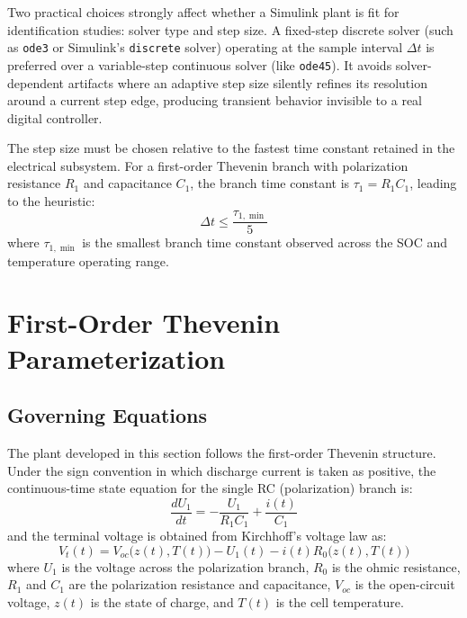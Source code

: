 Two practical choices strongly affect whether a Simulink plant is fit for identification studies: solver type and step size. A fixed-step discrete solver (such as \texttt{ode3} or Simulink's \texttt{discrete} solver) operating at the sample interval $\Delta t$ is preferred over a variable-step continuous solver (like \texttt{ode45}). It avoids solver-dependent artifacts where an adaptive step size silently refines its resolution around a current step edge, producing transient behavior invisible to a real digital controller.

The step size must be chosen relative to the fastest time constant retained in the electrical subsystem. For a first-order Thevenin branch with polarization resistance $R_1$ and capacitance $C_1$, the branch time constant is $\tau_1 = R_1 C_1$, leading to the heuristic:
\begin{equation}
\Delta t \le \frac{\tau_{1,\min}}{5}
\label{eq:10_step_rule}
\end{equation}
where $\tau_{1,\min}$ is the smallest branch time constant observed across the SOC and temperature operating range. 

\section{First-Order Thevenin Parameterization}
\label{sec:10_2}

\subsection{Governing Equations}

The plant developed in this section follows the first-order Thevenin structure. Under the sign convention in which discharge current is taken as positive, the continuous-time state equation for the single RC (polarization) branch is:
\begin{equation}
\frac{dU_1}{dt} = -\frac{U_1}{R_1 C_1} + \frac{i(t)}{C_1}
\label{eq:10_rc_state}
\end{equation}
and the terminal voltage is obtained from Kirchhoff's voltage law as:
\begin{equation}
V_t(t) = V_{oc}\big(z(t), T(t)\big) - U_1(t) - i(t) R_0\big(z(t), T(t)\big)
\label{eq:10_terminal}
\end{equation}
where $U_1$ is the voltage across the polarization branch, $R_0$ is the ohmic resistance, $R_1$ and $C_1$ are the polarization resistance and capacitance, $V_{oc}$ is the open-circuit voltage, $z(t)$ is the state of charge, and $T(t)$ is the cell temperature. 

